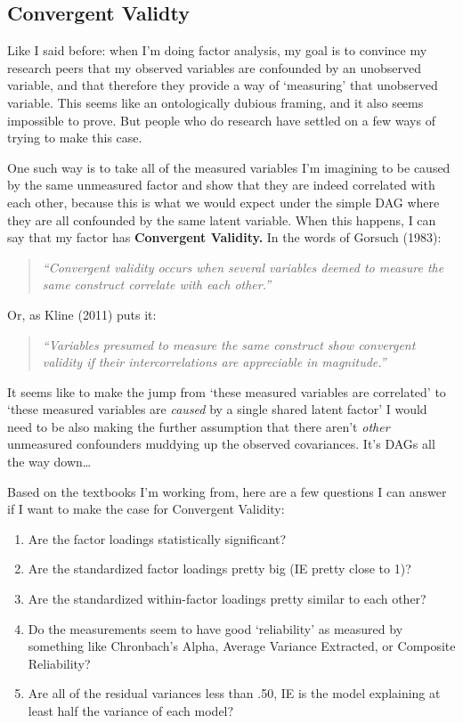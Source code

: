 \documentclass[
  letterpaper,
  DIV=11,
  numbers=noendperiod]{scrreprt}
\providecommand{\tightlist}{%
  \setlength{\itemsep}{0pt}\setlength{\parskip}{0pt}}\usepackage{longtable,booktabs,array}
\begin{document}
\hypertarget{convergent-validty}{%
\subsection*{Convergent Validty}\label{convergent-validty}}

Like I said before: when I'm doing factor analysis, my goal is to
convince my research peers that my observed variables are confounded by
an unobserved variable, and that therefore they provide a way of
`measuring' that unobserved variable. This seems like an ontologically
dubious framing, and it also seems impossible to prove. But people who
do research have settled on a few ways of trying to make this case.

One such way is to take all of the measured variables I'm imagining to
be caused by the same unmeasured factor and show that they are indeed
correlated with each other, because this is what we would expect under
the simple DAG where they are all confounded by the same latent
variable. When this happens, I can say that my factor has
\textbf{Convergent Validity.} In the words of Gorsuch (1983):

\begin{quote}
\emph{``Convergent validity occurs when several variables deemed to
measure the same construct correlate with each other.''}
\end{quote}

Or, as Kline (2011) puts it:

\begin{quote}
\emph{``Variables presumed to measure the same construct show convergent
validity if their intercorrelations are appreciable in magnitude.''}
\end{quote}

It seems like to make the jump from `these measured variables are
correlated' to `these measured variables are \emph{caused} by a single
shared latent factor' I would need to be also making the further
assumption that there aren't \emph{other} unmeasured confounders
muddying up the observed covariances. It's DAGs all the way down\ldots{}

Based on the textbooks I'm working from, here are a few questions I can
answer if I want to make the case for Convergent Validity:

\begin{enumerate}
\def\labelenumi{\arabic{enumi}.}
\tightlist
\item
  Are the factor loadings statistically significant?
\item
  Are the standardized factor loadings pretty big (IE pretty close to
  1)?
\item
  Are the standardized within-factor loadings pretty similar to each
  other?
\item
  Do the measurements seem to have good `reliability' as measured by
  something like Chronbach's Alpha, Average Variance Extracted, or
  Composite Reliability?
\item
  Are all of the residual variances less than .50, IE is the model
  explaining at least half the variance of each model?
\end{enumerate}
\end{document}
